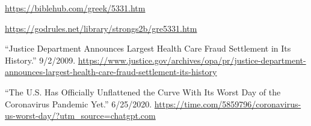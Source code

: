 \documentclass[10pt]{article}
\begin{document}
\begin{multicols}{2}
\begin{thebibliography}{9}
	{\footnotesize
		
	 \url{https://biblehub.com/greek/5331.htm}
	
	 \url{https://godrules.net/library/strongs2b/gre5331.htm}
	
	 ``Justice Department Announces Largest Health Care Fraud Settlement in Its History.'' 9/2/2009. \url{https://www.justice.gov/archives/opa/pr/justice-department-announces-largest-health-care-fraud-settlement-its-history}
	
	 ``The U.S. Has Officially Unflattened the Curve With Its Worst Day of the Coronavirus Pandemic Yet.'' 6/25/2020. \url{https://time.com/5859796/coronavirus-us-worst-day/?utm_source=chatgpt.com}
	
	}
\end{thebibliography}

\end{multicols}


\end{document}
